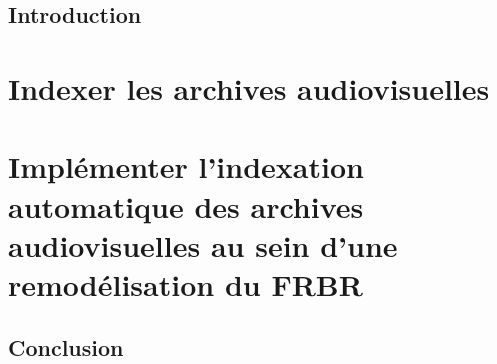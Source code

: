\documentclass[12pt,twoside]{book}
\begin{document}
\printbibliography[keyword=indexation,
heading=subbibliography,
title={Indexation automatique}]

\printbibliography[keyword=nlp,
heading=subbibliography,
title={NLP}]


	
\chapter{Introduction}	


\newpage{\pagestyle{empty}\cleardoublepage}

	\mainmatter

	

	\part{Indexer les archives audiovisuelles}






%
%	
	
	\part{Implémenter l’indexation automatique des archives audiovisuelles au sein d’une remodélisation du FRBR}
	
	

	
	
	\chapter*{Conclusion}
\newpage{\pagestyle{empty}\cleardoublepage}
	
\end{document}
